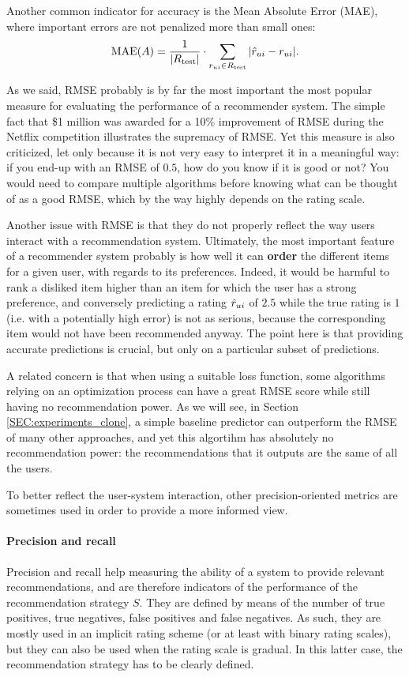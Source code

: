 Another common indicator for accuracy is the Mean Absolute Error (MAE), where
important errors are not penalized more than small ones:
$$\text{MAE}(A) = \frac{1}{|R_{\text{test}}|} \cdot \sum_{r_{ui} \in R_{\text{test}}}|\hat{r}_{ui} -
r_{ui}|.$$

As we said, RMSE probably is by far the most important the most popular measure for
evaluating the performance of a recommender system. The simple fact that \$1
million was awarded for a 10\% improvement of RMSE during the Netflix competition
illustrates the supremacy of RMSE. Yet this measure is also criticized, let
only because it is not very easy to interpret it in a meaningful way: if you
end-up with an RMSE of $0.5$, how do you know if it is good or not? You would
need to compare multiple algorithms before knowing what can be thought of as a
good RMSE, which by the way highly depends on  the rating scale.

Another issue with RMSE is that they do not properly reflect the way users
interact with a recommendation system.  Ultimately, the most important feature
of a recommender system probably is how well it can \textbf{order} the
different items for a given user, with regards to its preferences. Indeed, it
would be harmful to rank a disliked item higher than an item for which the user
has a strong preference, and conversely predicting a rating $\hat{r}_{ui}$ of $2.5$
while the true rating is $1$ (i.e. with a potentially high error) is not as
serious, because the corresponding item would not have been recommended anyway.
The point here is that providing accurate predictions is crucial, but only on a
particular subset of predictions.

A related concern is that when using a suitable loss function, some algorithms
relying on an optimization process
can have a great RMSE score while still having no recommendation power.
As we will see, in Section \ref{SEC:experiments_clone}, a simple baseline
predictor  can outperform the RMSE of many other approaches, and yet this
algortihm has absolutely no recommendation power: the recommendations that it
outputs are the same of all the users.

To better reflect the user-system interaction, other precision-oriented metrics
are sometimes used in order to provide a more informed view.

\paragraph{Precision and recall\\}
Precision and recall help measuring the ability of a system to provide relevant
recommendations, and are therefore indicators of the performance of the
recommendation strategy $S$. They are defined by means of the number of true
positives, true negatives, false positives and false negatives. As such, they
are mostly used in an implicit rating scheme (or at least with binary rating
scales), but they can also be used when the rating scale is gradual. In this
latter case, the recommendation strategy has to be clearly defined.

